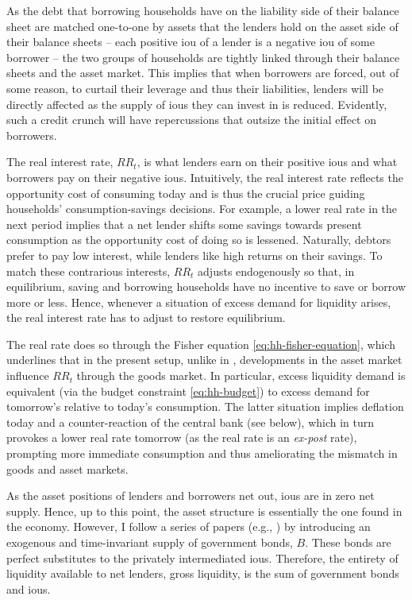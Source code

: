\documentclass[a4paper,12pt]{article} %
\numberwithin{equation}{section} %
\numberwithin{figure}{section}
\numberwithin{table}{section}
\begin{document}
As the debt that borrowing households have on the liability side of their balance sheet are matched one-to-one by assets that the lenders hold on the asset side of their balance sheets -- each positive \Gls{iou} of a lender is a negative \Gls{iou} of some borrower -- the two groups of households are tightly linked through their balance sheets and the asset market. This implies that when borrowers are forced, out of some reason, to curtail their leverage and thus their liabilities, lenders will be directly affected as the supply of \Gls{iou}s they can invest in is reduced. Evidently, such a credit crunch will have repercussions that outsize the initial effect on borrowers.

The real interest rate, $RR_t$, is what lenders earn on their positive \Gls{iou}s and what borrowers pay on their negative \Gls{iou}s. Intuitively, the real interest rate reflects the opportunity cost of consuming today and is thus the crucial price guiding households' consumption-savings decisions. For example, a lower real rate in the next period implies that a net lender shifts some savings towards present consumption as the opportunity cost of doing so is lessened. Naturally, debtors prefer to pay low interest, while lenders like high returns on their savings. To match these contrarious interests, $RR_t$ adjusts endogenously so that, in equilibrium, saving and borrowing households have no incentive to save or borrow more or less. Hence, whenever a situation of excess demand for liquidity arises, the real interest rate has to adjust to restore equilibrium.

The real rate does so through the Fisher equation \eqref{eq:hh-fisher-equation}, which underlines that in the present setup, unlike in \textcite{gl2017}, developments in the asset market influence $RR_t$ through the goods market. In particular, excess liquidity demand is equivalent (via the budget constraint \eqref{eq:hh-budget}) to excess demand for tomorrow's relative to today's consumption. The latter situation implies deflation today and a counter-reaction of the central bank (see below), which in turn provokes a lower real rate tomorrow (as the real rate is an \textit{ex-post} rate), prompting more immediate consumption and thus ameliorating the mismatch in goods and asset markets. 

As the asset positions of lenders and borrowers net out, \Gls{iou}s are in zero net supply. Hence, up to this point, the asset structure is essentially the one found in the \textcite{huggett1993} economy. However, I follow a series of papers (e.g.\cite{gl2017}, \cite{bayer2023}) by introducing an exogenous and time-invariant supply of government bonds, $B$. These bonds are perfect substitutes to the privately intermediated \Gls{iou}s. Therefore, the entirety of liquidity available to net lenders, gross liquidity, is the sum of government bonds and \Gls{iou}s.
\end{document}

